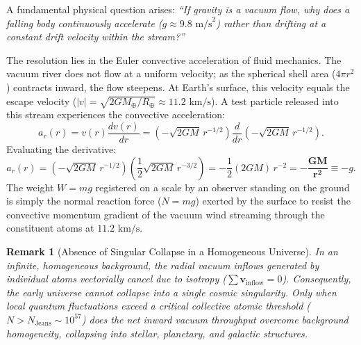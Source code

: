 \documentclass[11pt,a4paper]{article}
\newtheorem{remark}{Remark}[section]
\begin{document}
A fundamental physical question arises: \textit{``If gravity is a vacuum flow, why does a falling body continuously accelerate ($g \approx 9.8\text{ m/s}^2$) rather than drifting at a constant drift velocity within the stream?''}

The resolution lies in the Euler convective acceleration of fluid mechanics. The vacuum river does not flow at a uniform velocity; as the spherical shell area ($4\pi r^2$) contracts inward, the flow steepens. At Earth's surface, this velocity equals the escape velocity ($|v| = \sqrt{2GM_\oplus/R_\oplus} \approx 11.2\text{ km/s}$). A test particle released into this stream experiences the convective acceleration:
\begin{equation}
    a_r(r) = v(r) \frac{dv(r)}{dr} = \left(-\sqrt{2GM} \, r^{-1/2}\right) \frac{d}{dr}\left(-\sqrt{2GM} \, r^{-1/2}\right).
\end{equation}
Evaluating the derivative:
\begin{equation}
    a_r(r) = \left(-\sqrt{2GM} \, r^{-1/2}\right) \left(\frac{1}{2}\sqrt{2GM} \, r^{-3/2}\right) = -\frac{1}{2}(2GM) \, r^{-2} = \mathbf{-\frac{GM}{r^2}} \equiv -g.
    \label{eq:g_ispat_p1}
\end{equation}
The weight $W = mg$ registered on a scale by an observer standing on the ground is simply the normal reaction force ($N = mg$) exerted by the surface to resist the convective momentum gradient of the vacuum wind streaming through the constituent atoms at $11.2\text{ km/s}$.

\begin{remark}[Absence of Singular Collapse in a Homogeneous Universe]
    In an infinite, homogeneous background, the radial vacuum inflows generated by individual atoms vectorially cancel due to isotropy ($\sum \mathbf{v}_{\mathrm{inflow}} = 0$). Consequently, the early universe cannot collapse into a single cosmic singularity. Only when local quantum fluctuations exceed a critical collective atomic threshold ($N > N_{\mathrm{Jeans}} \sim 10^{57}$) does the net inward vacuum throughput overcome background homogeneity, collapsing into stellar, planetary, and galactic structures.
\end{remark}
\end{document}
